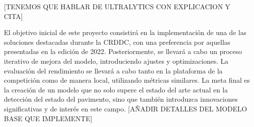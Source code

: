 [TENEMOS QUE HABLAR DE ULTRALYTICS CON EXPLICACION Y CITA]

El objetivo inicial de este proyecto consistirá en la implementación de una de las soluciones
destacadas durante la CRDDC, con una preferencia por aquellas presentadas en la edición de
2022. Posteriormente, se llevará a cabo un proceso iterativo de mejora del modelo,
introduciendo ajustes y optimizaciones. La evaluación del rendimiento se llevará a cabo
tanto en la plataforma de la competición como de manera local, utilizando métricas
similares. La meta final es la creación de un modelo que no solo supere el estado del arte
actual en la detección del estado del pavimento, sino que también introduzca innovaciones
significativas y de interés en este campo.
[AÑADIR DETALLES DEL MODELO BASE QUE IMPLEMENTE]